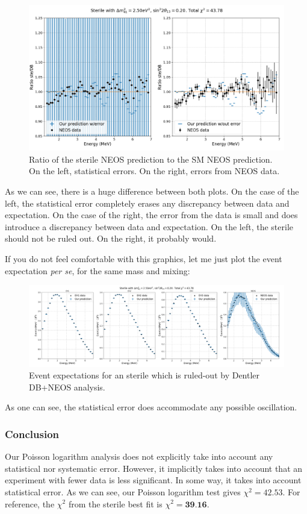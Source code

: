 \documentclass[a4paper, 10 pt]{article}
\begin{document}
\begin{figure}[h]
	\centering
	\includegraphics[width=0.7\linewidth]{GlobalFit/Figures/NEOSRatio_2.50_ste}
	\caption{Ratio of the sterile NEOS prediction to the SM NEOS prediction. On the left, statistical errors. On the right, errors from NEOS data.}
	\label{fig:neosratio6}
\end{figure}

As we can see, there is a huge difference between both plots. On the case of the left, the statistical error completely erases any discrepancy between data and expectation. On the case of the right, the error from the data is small and does introduce a discrepancy between data and expectation. On the left, the sterile should not be ruled out. On the right, it probably would.

If you do not feel comfortable with this graphics, let me just plot the event expectation \textit{per se}, for the same mass and mixing:
\begin{figure}[h]
	\centering
	\includegraphics[width=\linewidth]{GlobalFit/Figures/EventExpectation_2.50_ste}
	\caption{Event expectations for an sterile which is ruled-out by Dentler DB+NEOS analysis.}
	\label{fig:eventexpectation2}
\end{figure}

As one can see, the statistical error does accommodate any possible oscillation.

\subsubsection*{Conclusion}
Our Poisson logarithm analysis does not explicitly take into account any statistical nor systematic error. However, it implicitly takes into account that an experiment with fewer data is less significant. In some way, it takes into account statistical error. As we can see, our Poisson logarithm test gives $\chi^2 =42.53$. For reference, the $\chi^2$ from the sterile best fit is $\chi^2 = \textbf{39.16}$. 
\end{document}
